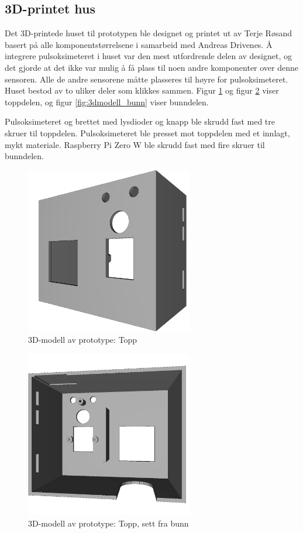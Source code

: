 \subsection{3D-printet hus}
Det 3D-printede huset til prototypen ble designet og printet ut av Terje Røsand basert på alle komponentstørrelsene i samarbeid
med Andreas Drivenes. Å integrere pulsoksimeteret i huset var den mest utfordrende delen av designet, og det gjorde at det ikke var
mulig å få plass til noen andre komponenter over denne sensoren. Alle de andre sensorene måtte plasseres til høyre for pulsoksimeteret.
Huset bestod av to uliker deler som klikkes sammen. Figur \ref{fig:3dmodell_topp1}
og figur \ref{fig:3dmodell_topp2} viser toppdelen, og figur \ref{fig:3dmodell_bunn} viser bunndelen.

Pulsoksimeteret og brettet med lysdioder og knapp ble skrudd fast med tre skruer til toppdelen. Pulsoksimeteret ble presset mot toppdelen
med et innlagt, mykt materiale. Raspberry Pi Zero W ble skrudd fast med fire skruer til bunndelen.

\begin{figure}
\includegraphics[width=0.65\textwidth, center]{fig/prototype/hoved_fra_topp}
\caption{3D-modell av prototype: Topp}
\label{fig:3dmodell_topp1}
\end{figure}
\begin{figure}

\includegraphics[width=0.65\textwidth, center]{fig/prototype/hoved_frabunn}
\caption{3D-modell av prototype: Topp, sett fra bunn}
\label{fig:3dmodell_topp2}
\end{figure}

